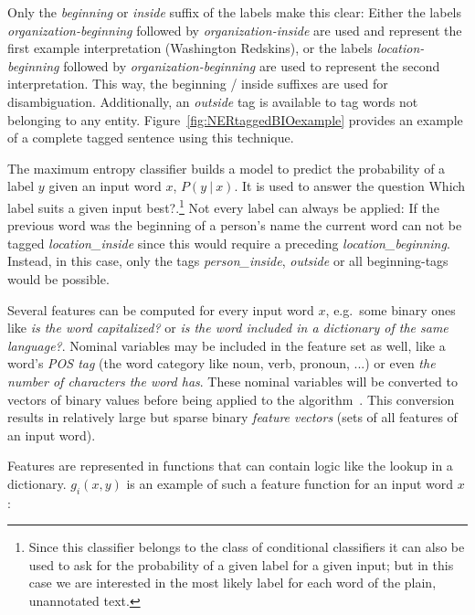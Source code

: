 		Only the \textit{beginning} or \textit{inside} suffix of the labels make this clear: Either the labels \textit{organization-beginning} followed by \textit{organization-inside} are used and represent the first example interpretation (\lqq Washington Redskins\rqq), or the labels \textit{location-beginning} followed by \textit{organization-beginning} are used to represent the second interpretation. This way, the beginning / inside suffixes are used for disambiguation. Additionally, an \textit{outside} tag is available to tag words not belonging to any entity. Figure~\ref{fig:NERtaggedBIOexample} provides an example of a complete tagged sentence using this technique.


		The maximum entropy classifier builds a model to predict the probability of a label $y$ given an input word $x$, $P(y\ |\ x)$. It is used to answer the question \lqq Which label suits a given input best?\rqq.\footnote{Since this classifier belongs to the class of conditional classifiers it can also be used to ask for the probability of a given label for a given input; but in this case we are interested in the most likely label for each word of the plain, unannotated text.}
		Not every label can always be applied: If the previous word was the beginning of a person's name the current word can not be tagged \textit{location\_inside} since this would require a preceding \textit{location\_beginning}. Instead, in this case, only the tags \textit{person\_inside}, \textit{outside} or all beginning-tags would be possible.

		Several features can be computed for every input word $x$, e.g.~some binary ones like \textit{is the word capitalized?} or \textit{is the word included in a dictionary of the same language?}. Nominal variables may be included in the feature set as well, like a word's \textit{\acf{POS} tag} (the word category like noun, verb, pronoun, ...) or even \textit{the number of characters the word has}. These nominal variables will be converted to vectors of binary values before being applied to the algorithm~\cite{nigam1999using}. This conversion results in relatively large but sparse binary \textit{feature vectors} (sets of all features of an input word).

		Features are represented in functions that can contain logic like the lookup in a dictionary. \(g_i(x, y)\) is an example of such a feature function for an input word $x$:

